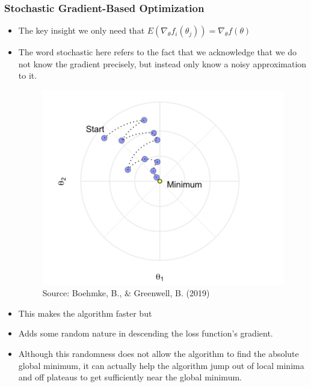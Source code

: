 \documentclass[
  shownotes,
  xcolor={svgnames},
  hyperref={colorlinks,citecolor=DarkBlue,linkcolor=DarkRed,urlcolor=DarkBlue}
  , aspectratio=169]{beamer}
\begin{document}
\begin{frame}[fragile]
\frametitle{Stochastic Gradient-Based Optimization}
\begin{itemize}
 \item The key insight we only need that $E(\nabla_{\theta} f_i(\theta_j))=\nabla_{\theta} f(\theta)$ 
\item  The word stochastic here refers to the fact that we acknowledge that we do not know the gradient precisely, but instead only know a noisy approximation to it. 



\begin{figure}[H] \centering
  \centering
  \includegraphics[scale=0.3]{figures/sgd.png}
  \\
  \tiny
  Source: Boehmke, B., \& Greenwell, B. (2019)
\end{figure}

\footnotesize
\item This makes the algorithm faster but 
\item Adds some random nature in descending the loss function’s gradient. 
\item Although this randomness does not allow the algorithm to find the absolute global minimum, it can actually help the algorithm jump out of local minima and off plateaus to get sufficiently near the global minimum.
\end{itemize}
\end{frame}
\end{document}

